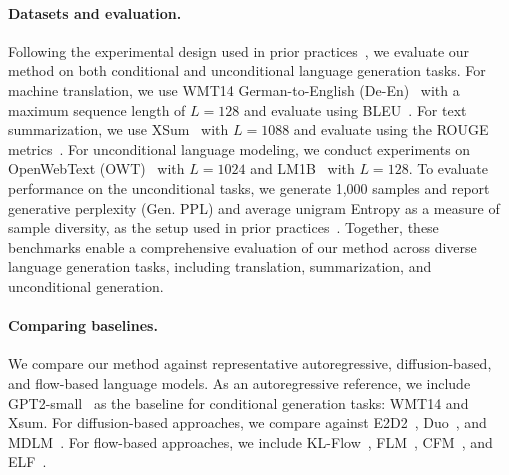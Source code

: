 \documentclass{article} %
\begin{document}
\paragraph{Datasets and evaluation.}
Following the experimental design used in prior practices~\citep{hu2026elf, roos2026categoricalflowmaps, sahoo2024simple, lee2026flowmaplanguagemodels}, we evaluate our method on both conditional and unconditional language generation tasks. For machine translation, we use WMT14 German-to-English (De-En)~\citep{bojar-etal-2014-findings} with a maximum sequence length of $L=128$ and evaluate using BLEU~\citep{papineni-etal-2002-bleu}. For text summarization, we use XSum~\citep{narayan2018dontdetailsjustsummary} with $L=1088$ and evaluate using the ROUGE metrics~\citep{lin-2004-rouge}. For unconditional language modeling, we conduct experiments on OpenWebText (OWT)~\citep{Gokaslan2019OpenWeb} with $L=1024$ and LM1B~\citep{chelba2014billionwordbenchmarkmeasuring} with $L=128$. To evaluate performance on the unconditional tasks, we generate 1,000 samples and report generative perplexity (Gen. PPL) and average unigram Entropy as a measure of sample diversity, as the setup used in prior practices~\citep{hu2026elf, lee2026flowmaplanguagemodels}.
Together, these benchmarks enable a comprehensive evaluation of our method across diverse language generation tasks, including translation, summarization, and unconditional generation.

\paragraph{Comparing baselines.} We compare our method against representative autoregressive, diffusion-based, and flow-based language models. As an autoregressive reference, we include GPT2-small~\citep{radford2019language} as the baseline for conditional generation tasks: WMT14 and Xsum. For diffusion-based approaches, we compare against E2D2~\citep{arriola2025encoderdecoderdiffusionlanguagemodels}, Duo~\citep{sahoo2025diffusionduality}, and MDLM~\citep{sahoo2024simple}. For flow-based approaches, we include KL-Flow~\citep{sevriugov2026logitklflowmatchingnonautoregressive}, FLM~\citep{lee2026flowmaplanguagemodels}, CFM~\citep{roos2026categoricalflowmaps}, and ELF~\citep{hu2026elf}. 
\end{document}

